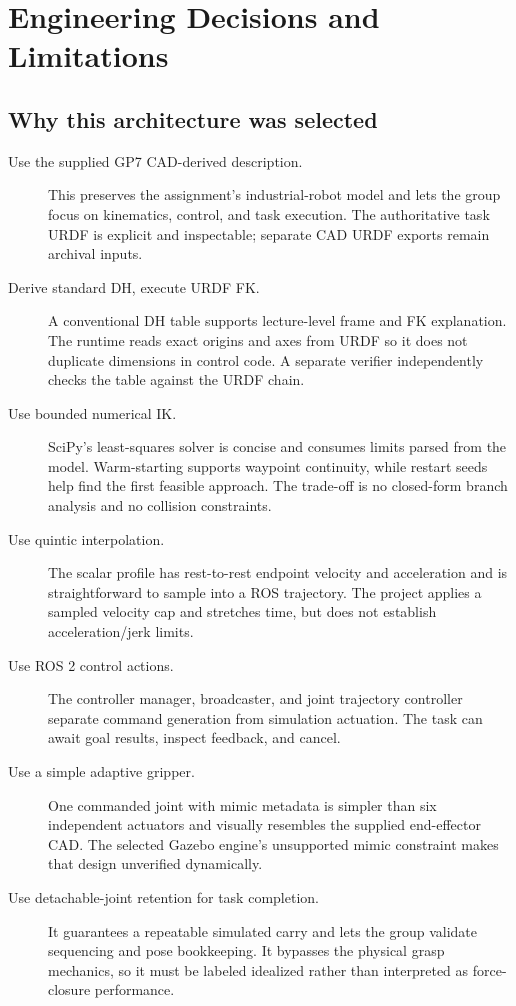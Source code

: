 \chapter{Engineering Decisions and Limitations}
\label{ch:decisions}

\section{Why this architecture was selected}
\begin{description}
 \item[Use the supplied GP7 CAD-derived description.] This preserves the
 assignment's industrial-robot model and lets the group focus on kinematics,
 control, and task execution. The authoritative task URDF is explicit and
 inspectable; separate CAD URDF exports remain archival inputs.
 \item[Derive standard DH, execute URDF FK.] A conventional DH table supports
 lecture-level frame and FK explanation. The runtime reads exact origins and
 axes from URDF so it does not duplicate dimensions in control code. A
 separate verifier independently checks the table against the URDF chain.
 \item[Use bounded numerical IK.] SciPy's least-squares solver is concise and
 consumes limits parsed from the model. Warm-starting supports waypoint
 continuity, while restart seeds help find the first feasible approach. The
 trade-off is no closed-form branch analysis and no collision constraints.
 \item[Use quintic interpolation.] The scalar profile has rest-to-rest
 endpoint velocity and acceleration and is straightforward to sample into a
 ROS trajectory. The project applies a sampled velocity cap and stretches
 time, but does not establish acceleration/jerk limits.
 \item[Use ROS 2 control actions.] The controller manager, broadcaster, and
 joint trajectory controller separate command generation from simulation
 actuation. The task can await goal results, inspect feedback, and cancel.
 \item[Use a simple adaptive gripper.] One commanded joint with mimic metadata
 is simpler than six independent actuators and visually resembles the
 supplied end-effector CAD. The selected Gazebo engine's unsupported mimic
 constraint makes that design unverified dynamically.
 \item[Use detachable-joint retention for task completion.] It guarantees a
 repeatable simulated carry and lets the group validate sequencing and pose
 bookkeeping. It bypasses the physical grasp mechanics, so it must be labeled
 idealized rather than interpreted as force-closure performance.
\end{description}

